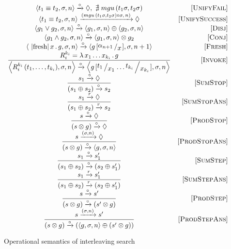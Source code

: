 \begin{figure*}[t]
  \renewcommand{\arraystretch}{1.6}
  \[
  \begin{array}{cr}
    \inbr{t_1 \equiv t_2, \sigma, n} \xrightarrow{\step} \Diamond , \, \, \nexists\; mgu\,(t_1 \sigma, t_2 \sigma) &\ruleno{UnifyFail} \\
    \inbr{t_1 \equiv t_2, \sigma, n} \xrightarrow{(mgu\,(t_1 \sigma, t_2 \sigma) \circ \sigma,\, n)} \Diamond & \ruleno{UnifySuccess} \\
    \inbr{g_1 \lor g_2, \sigma, n} \xrightarrow{\step} \inbr{g_1, \sigma, n} \oplus \inbr{g_2, \sigma, n} & \ruleno{Disj} \\
    \inbr{g_1 \land g_2, \sigma, n} \xrightarrow{\step} \inbr{ g_1, \sigma, n} \otimes g_2 & \ruleno{Conj} \\
    \inbr{\mbox{\lstinline|fresh|}\, x\, .\, g, \sigma, n} \xrightarrow{\step} \inbr{g\,[\bigslant{\alpha_{n + 1}}{x}], \sigma, n + 1} & \ruleno{Fresh} \\
    \dfrac{R_i^{k_i}=\lambda\,x_1\dots x_{k_i}\,.\,g}{\inbr{R_i^{k_i}\,(t_1,\dots,t_{k_i}),\sigma,n} \xrightarrow{\step} \inbr{g\,[\bigslant{t_1}{x_1}\dots\bigslant{t_{k_i}}{x_{k_i}}], \sigma, n}} & \ruleno{Invoke}\\
    \dfrac{s_1 \xrightarrow{\step} \Diamond}{(s_1 \oplus s_2) \xrightarrow{\step} s_2} & \ruleno{SumStop}\\
    \dfrac{s_1 \xrightarrow{r} \Diamond}{(s_1 \oplus s_2) \xrightarrow{r} s_2} & \ruleno{SumStopAns}\\
    \dfrac{s \xrightarrow{\step} \Diamond}{(s \otimes g) \xrightarrow{\step} \Diamond} &\ruleno{ProdStop}\\
    \dfrac{s \xrightarrow{(\sigma, n)} \Diamond}{(s \otimes g) \xrightarrow{\step} \inbr{g, \sigma, n}}  & \ruleno{ProdStopAns}\\
    \dfrac{s_1 \xrightarrow{\step} s'_1}{(s_1 \oplus s_2) \xrightarrow{\step} (s_2 \oplus s'_1)} &\ruleno{SumStep}\\
    \dfrac{s_1 \xrightarrow{r} s'_1}{(s_1 \oplus s_2) \xrightarrow{r} (s_2 \oplus s'_1)} &\ruleno{SumStepAns}\\
    \dfrac{s \xrightarrow{\step} s'}{(s \otimes g) \xrightarrow{\step} (s' \otimes g)} &\ruleno{ProdStep}\\
    \dfrac{s \xrightarrow{(\sigma, n)} s'}{(s \otimes g) \xrightarrow{\step} (\inbr{g, \sigma, n} \oplus (s' \otimes g))} & \ruleno{ProdStepAns} 
  \end{array}
  \]
  \caption{Operational semantics of interleaving search}
  \label{lts}
\end{figure*}

